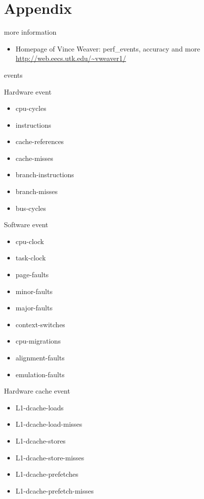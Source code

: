 \appendix
\section{Appendix}

\begin{frame}{more information}
\begin{itemize}
  \item Homepage of Vince Weaver: perf\_events, accuracy and more
    \url{http://web.eecs.utk.edu/~vweaver1/}
\end{itemize}
\end{frame}

\begin{frame}{events}
\begin{tiny}
\begin{multicols}{3}
Hardware event
\begin{itemize}
  \item cpu-cycles
  \item instructions
  \item cache-references
  \item cache-misses
  \item branch-instructions
  \item branch-misses
  \item bus-cycles
\end{itemize}
Software event
\begin{itemize}
  \item cpu-clock
  \item task-clock
  \item page-faults
  \item minor-faults
  \item major-faults
  \item context-switches
  \item cpu-migrations
  \item alignment-faults
  \item emulation-faults
\end{itemize}
Hardware cache event
\begin{itemize}
  \item L1-dcache-loads
  \item L1-dcache-load-misses
  \item L1-dcache-stores
  \item L1-dcache-store-misses
  \item L1-dcache-prefetches
  \item L1-dcache-prefetch-misses

\end{itemize}
\end{multicols}
\end{tiny}
\end{frame}

